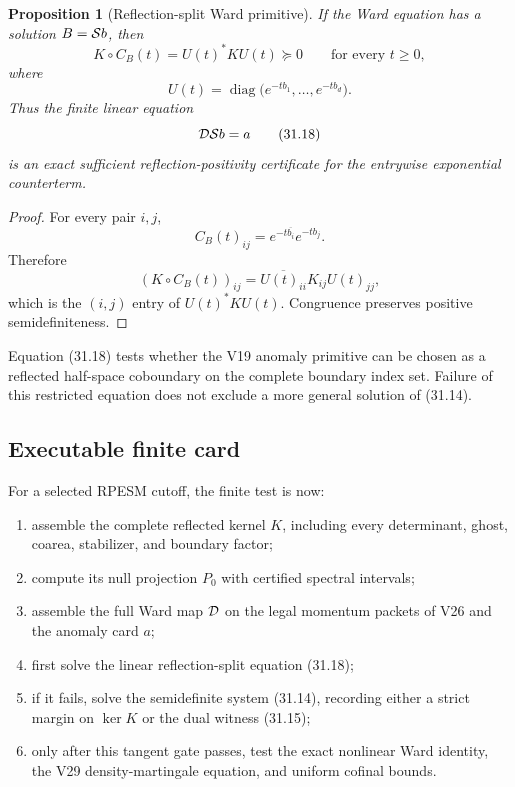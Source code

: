 \documentclass[11pt]{article}
\newtheorem{proposition}[theorem]{Proposition}
\theoremstyle{remark}
\begin{document}
\begin{proposition}[Reflection-split Ward primitive]
\label{prop:v12v31-reflection-split}
If the Ward equation has a solution \(B={\cal S}b\), then
\begin{equation}
 K\circ C_B(t)=U(t)^*KU(t)\succeq0
 \qquad\text{for every }t\geq0,                  \tag{31.17}
\end{equation}
where
\[
 U(t)=\operatorname{diag}
 \bigl(e^{-tb_1},\ldots,e^{-tb_d}\bigr).
\]
Thus the finite linear equation
\begin{equation}
                         {\cal D}{\cal S}b=a      \tag{31.18}
\end{equation}
is an exact sufficient reflection-positivity certificate for the
entrywise exponential counterterm.
\end{proposition}

\begin{proof}
For every pair \(i,j\),
\[
 C_B(t)_{ij}
 =
 e^{-t\overline{b_i}}e^{-tb_j}.
\]
Therefore
\[
 (K\circ C_B(t))_{ij}
 =
 \overline{U(t)_{ii}}K_{ij}U(t)_{jj},
\]
which is the \((i,j)\) entry of \(U(t)^*KU(t)\).
Congruence preserves positive semidefiniteness.
\end{proof}

Equation (31.18) tests whether the V19 anomaly primitive can be chosen
as a reflected half-space coboundary on the complete boundary index
set.  Failure of this restricted equation does not exclude a more
general solution of (31.14).

\subsection{Executable finite card}

For a selected RPESM cutoff, the finite test is now:

\begin{enumerate}
\item assemble the complete reflected kernel \(K\), including every
determinant, ghost, coarea, stabilizer, and boundary factor;
\item compute its null projection \(P_0\) with certified spectral
intervals;
\item assemble the full Ward map \({\cal D}\) on the legal momentum
packets of V26 and the anomaly card \(a\);
\item first solve the linear reflection-split equation (31.18);
\item if it fails, solve the semidefinite system (31.14), recording
either a strict margin on \(\ker K\) or the dual witness (31.15);
\item only after this tangent gate passes, test the exact nonlinear
Ward identity, the V29 density-martingale equation, and uniform
cofinal bounds.
\end{enumerate}
\end{document}
